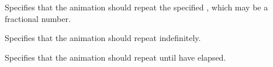 \begin{command}{\pgfsys@animation@repeat{}}
  Specifies that the animation should repeat the specified
  , which may be a fractional number.
\end{command}

\begin{command}{\pgfsys@animation@repeat@indefinite}
  Specifies that the animation should repeat indefinitely.
\end{command}

\begin{command}{\pgfsys@animation@repeat@dur{}}
  Specifies that the animation should repeat until  have
  elapsed. 
\end{command}




